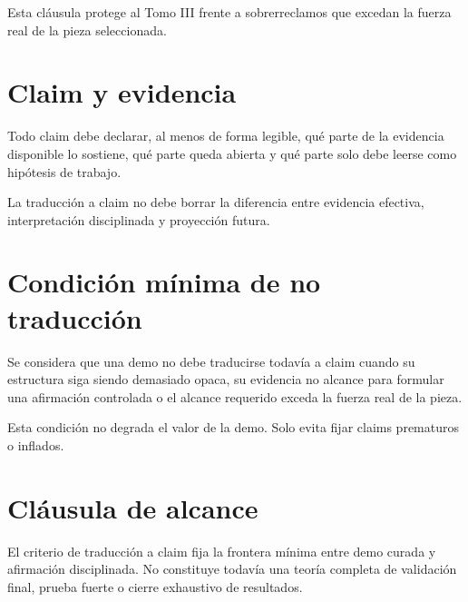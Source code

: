 \begin{observation}
Esta cláusula protege al Tomo III frente a sobrerreclamos que excedan la fuerza real de la pieza seleccionada.
\end{observation}

\section{Claim y evidencia}
\begin{definition}
Todo claim debe declarar, al menos de forma legible, qué parte de la evidencia disponible lo sostiene, qué parte queda abierta y qué parte solo debe leerse como hipótesis de trabajo.
\end{definition}

\begin{observation}
La traducción a claim no debe borrar la diferencia entre evidencia efectiva, interpretación disciplinada y proyección futura.
\end{observation}

\section{Condición mínima de no traducción}
\begin{definition}
Se considera que una demo no debe traducirse todavía a claim cuando su estructura siga siendo demasiado opaca, su evidencia no alcance para formular una afirmación controlada o el alcance requerido exceda la fuerza real de la pieza.
\end{definition}

\begin{observation}
Esta condición no degrada el valor de la demo. Solo evita fijar claims prematuros o inflados.
\end{observation}

\section{Cláusula de alcance}
\begin{observation}
El criterio de traducción a claim fija la frontera mínima entre demo curada y afirmación disciplinada. No constituye todavía una teoría completa de validación final, prueba fuerte o cierre exhaustivo de resultados.
\end{observation}

